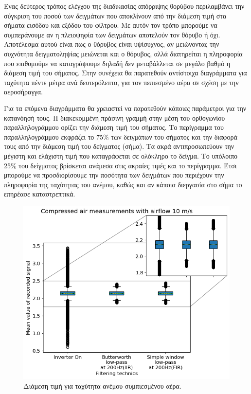 \documentclass[11pt]{article}
\newcommand{\en}[1]{\selectlanguage{english}\text{#1}\selectlanguage{greek}}
\begin{document}
Ένας δεύτερος τρόπος ελέγχου της διαδικασίας απόρριψης θορύβου περιλαμβάνει
την σύγκριση του ποσού των δειγμάτων που αποκλίνουν από την διάμεση τιμή στα
σήματα εισόδου και εξόδου του φίλτρου. Με αυτόν τον τρόπο μπορούμε να
συμπεράνουμε αν η πλειοψηφία των δειγμάτων αποτελούν τον θόρυβο ή όχι.
Αποτέλεσμα αυτού είναι πως ο θόρυβος είναι υψίσυχνος, αν μειώνοντας την
συχνότητα δειγματοληψίας μειώνεται και ο θόρυβος, αλλά διατηρείται η
πληροφορία που επιθυμούμε να καταγράψουμε δηλαδή δεν μεταβάλλεται σε μεγάλο
βαθμό η διάμεση τιμή του σήματος. Στην συνέχεια θα παρατεθούν αντίστοιχα
διαγράμματα για ταχύτητα πέντε μέτρα ανά δευτερόλεπτο, για τον
πεπιεσμένο αέρα σε σχέση με την αεροσήραγγα.

Για τα επόμενα διαγράμματα θα χρειαστεί να παρατεθούν κάποιες παράμετροι για
την κατανόησή τους. Η διακεκομμένη πράσινη γραμμή στην μέση του ορθογωνίου
παραλληλογράμμου ορίζει την διάμεση τιμή του σήματος. Το περίγραμμα του
παραλληλογράμμου εκφράζει το 75\% των δειγμάτων του σήματος και την διαφορά τους
από την διάμεση τιμή του δείγματος (σήμα). Τα ακρά αντιπροσωπεύουν την
μέγιστη και ελάχιστη τιμή που καταγράφεται σε ολόκληρο το δείγμα. Το υπόλοιπο
25\% του δείγματος βρίσκεται ανάμεσα στις ακραίες τιμές και το περίγραμμα. Έτσι
μπορούμε να προσδιορίσουμε την ποσότητα των δειγμάτων που περιέχουν την
πληροφορία της ταχύτητας του ανέμου, καθώς και αν κάποια διεργασία στο σήμα
το επηρέασε καταστρεπτικά.

\begin{figure}[t]
\centerline{\includegraphics[scale=.6]{./src/whiskr_ca.png}}
\caption{Διάμεση τιμή για ταχύτητα ανέμου \en{10\ m/s} συμπιεσμένου αέρα.}
\label{fig:ca-0-mean}
\end{figure}
\end{document}
